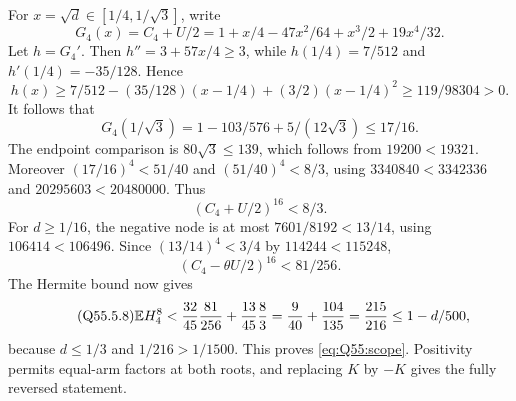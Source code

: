 For $x=\allowbreak \sqrt d\in[1/4,\allowbreak 1/\sqrt3]$, write
\[
 G_4(x)=C_4+U/2=1+x/4-47x^2/64+x^3/2+19x^4/32.
\]
Let $h=\allowbreak G_4'$. Then $h''=\allowbreak 3+57x/4\ge\allowbreak 3$, while
$h(1/4)=\allowbreak 7/512$ and $h'(1/4)=\allowbreak -35/128$. Hence
\[
 h(x)\ge7/512-(35/128)(x-1/4)+(3/2)(x-1/4)^2
 \ge119/98304>0.
\]
It follows that
\begin{equation}\tag{Q55.5.5}\label{eq:Q55:four-positive-node}
 G_4(1/\sqrt3)=1-103/576+5/(12\sqrt3)\le17/16.
\end{equation}
The endpoint comparison is $80\sqrt3\le\allowbreak 139$, which follows from
$19200<\allowbreak 19321$. Moreover $(17/16)^4<\allowbreak 51/40$ and $(51/40)^4<\allowbreak 8/3$,
using $3340840<\allowbreak 3342336$ and $20295603<\allowbreak 20480000$. Thus
\begin{equation}\tag{Q55.5.6}\label{eq:Q55:four-positive-power}
 (C_4+U/2)^{16}<8/3.
\end{equation}
For $d\ge\allowbreak 1/16$, the negative node is at most $7601/8192<\allowbreak 13/14$,
using $106414<\allowbreak 106496$. Since $(13/14)^4<\allowbreak 3/4$ by
$114244<\allowbreak 115248$,
\begin{equation}\tag{Q55.5.7}\label{eq:Q55:four-negative-power}
 (C_4-\theta U/2)^{16}<81/256.
\end{equation}
The Hermite bound now gives
\begin{equation}\tag{Q55.5.8}\label{eq:Q55:four-result}
 \mathbb E H_4^8<\frac{32}{45}\frac{81}{256}+\frac{13}{45}\frac83
 =\frac9{40}+\frac{104}{135}=\frac{215}{216}\le1-d/500,
\end{equation}
because $d\le\allowbreak 1/3$ and $1/216>\allowbreak 1/1500$.
This proves \eqref{eq:Q55:scope}. Positivity permits equal-arm factors at
both roots, and replacing $K$ by $-K$ gives the fully reversed statement.
